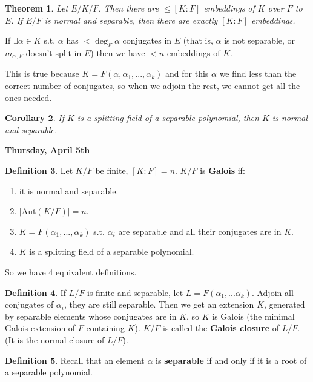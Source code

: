 \documentclass[9pt,reqno,twoside]{amsbook}
\theoremstyle{plain}
\newtheorem{theorem}{Theorem}[chapter]
\numberwithin{section}{chapter}
\numberwithin{equation}{chapter}
\newtheorem{Cor}[theorem]{Corollary}
\theoremstyle{definition}
\newtheorem{Def}[theorem]{Definition}
\theoremstyle{remark}
\theoremstyle{plain}
\newcommand{\bb}{\vspace{3mm}}
\renewcommand{\leq}{\leqslant}
\begin{document}
\begin{theorem}
Let $E/K/F$. Then there are $\leq [K:F]$ embeddings of $K$ over $F$ to $E$. If $E/F$ is normal and separable, then there are exactly $[K:F]$ embeddings. 
\end{theorem}

If $\exists \alpha \in K$ s.t. $\alpha$ has $< \deg_F\alpha$ conjugates in $E$ (that is, $\alpha$ is not separable, or $m_{\alpha,F}$ doesn't split in $E$) then we have $< n$ embeddings of $K$. 


This is true because $K = F(\alpha,\alpha_1,...,\alpha_k)$ and for this $\alpha$ we find less than the correct number of conjugates, so when we adjoin the rest, we cannot get all the ones needed. 

\begin{Cor}
If $K$ is a splitting field of a separable polynomial, then $K$ is normal and separable. 
\end{Cor}



\bb


\textbf{Thursday, April 5th}

\begin{Def}
Let $K/F$ be finite, $[K:F] = n$. $K/F$ is \textbf{Galois} if:
\begin{enumerate}
\item it is normal and separable. 
\item $|\text{Aut}(K/F)| = n$.
\item $K = F(\alpha_1,...,\alpha_k)$ s.t. $\alpha_i$ are separable and all their conjugates are in $K$.
\item $K$ is a splitting field of a separable polynomial.
\end{enumerate}
So we have 4 equivalent definitions. 
\end{Def}


\begin{Def}
If $L/F$ is finite and separable, let $L = F(\alpha_1,...\alpha_k)$. Adjoin all conjugates of $\alpha_i$, they are still separable. Then we get an extension $K$, generated by separable elements whose conjugates are in $K$, so $K$ is Galois (the minimal Galois extension of $F$ containing $K$). $K/F$ is called the \textbf{Galois closure} of $L/F$. (It is the normal closure of $L/F$). 
\end{Def}

\begin{Def}
Recall that an element $\alpha$ is \textbf{separable} if and only if it is a root of a separable polynomial. 
\end{Def}
\end{document}
